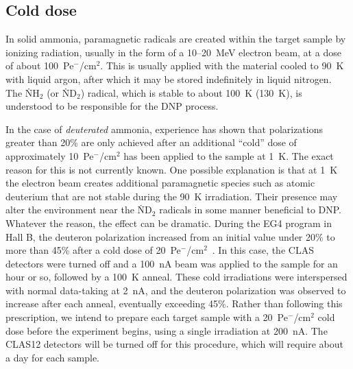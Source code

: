 \documentclass[preprint,12pt]{elsarticle}
\begin{document}
\subsection{Cold dose}
In solid ammonia, paramagnetic radicals are created within the target sample by ionizing radiation, usually 
in the form of a 10--20~MeV electron beam, at a dose of about 
100~Pe$^{\minus}$/cm$^2$.
This is usually applied with the material cooled to 90~K with liquid argon, after which it may be stored indefinitely in liquid nitrogen.  The \.{N}H$_2$ (or \.{N}D$_2$) radical, which is stable to about 100~K (130~K), is understood to be responsible for the DNP process.  

In the case of {\em deuterated\/} ammonia, experience has shown that polarizations greater than 20\% are only achieved after an additional 
``cold'' dose of approximately 10~Pe$^{\minus}$/cm$^2$ has been applied to the sample at 1~K.  
The exact reason for this is not currently known.  One possible explanation is that at 1~K the electron beam 
creates additional paramagnetic species such as atomic deuterium that are not stable during the 90~K irradiation.  Their presence may alter the environment near the \.{N}D$_2$ radicals in some manner beneficial to DNP.  Whatever the reason, the effect can be dramatic.
During the EG4 program in Hall B, the deuteron polarization increased from an initial value under 20\% to more than 45\%  after a cold dose of  20~Pe$^{\minus}$/cm$^2$~\cite{Slifer2007}.  In this case, the CLAS detectors were turned off and a 100~nA beam was applied to the sample for an hour or so, followed by a 100~K anneal.  These cold irradiations were interspersed with normal data-taking at 2~nA, and the deuteron polarization was observed to increase after each anneal, eventually exceeding 45\%.  Rather than following this prescription, we intend to prepare each target sample with a 20~Pe$^{\minus}$/cm$^2$ cold dose before the experiment begins, using a single irradiation at 200~nA.  The CLAS12 detectors will be turned off for this procedure, which will require about a day for each sample. 
\end{document}

